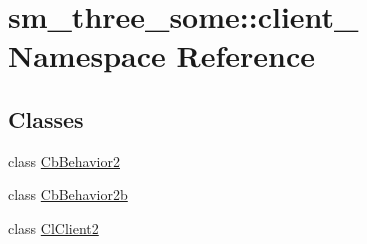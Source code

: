 \hypertarget{namespacesm__three__some_1_1client__2}{}\section{sm\+\_\+three\+\_\+some\+:\+:client\+\_ Namespace Reference}
\label{namespacesm__three__some_1_1client__2}
\subsection*{Classes}
\begin{DoxyCompactItemize}
\item 
class \hyperlink{classsm__three__some_1_1client__2_1_1CbBehavior2}{Cb\+Behavior2}
\item 
class \hyperlink{classsm__three__some_1_1client__2_1_1CbBehavior2b}{Cb\+Behavior2b}
\item 
class \hyperlink{classsm__three__some_1_1client__2_1_1ClClient2}{Cl\+Client2}
\end{DoxyCompactItemize}
